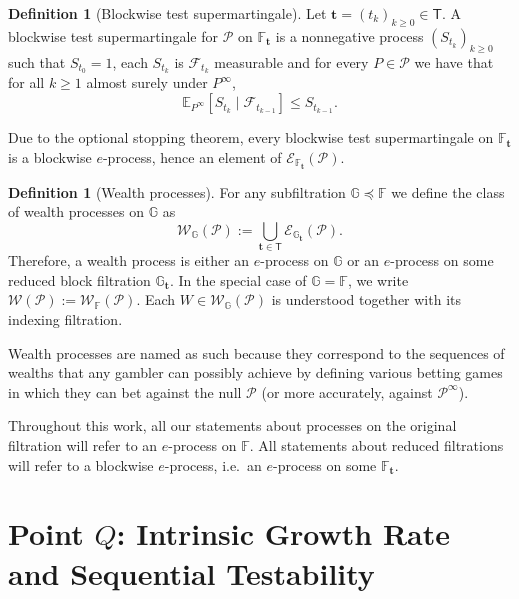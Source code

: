 \documentclass[11pt]{article}
\newcommand{\E}{\mathbb{E}}
\newcommand{\Pcal}{\mathcal{P}}
\newcommand{\bbF}{\mathbb F}
\newcommand{\bbG}{\mathbb G}
\newcommand{\bt}{\mathbf t}
\newcommand{\Tdet}{\mathsf T}
\newcommand{\Wcal}{\mathcal W}
\theoremstyle{definition}
\newtheorem{definition}[theorem]{Definition}
\theoremstyle{definition}
\begin{document}
\begin{definition}[Blockwise test supermartingale]\label{def:test-supermartingale}
Let $\bt=(t_k)_{k\ge 0}\in \Tdet$. A blockwise test supermartingale for $\Pcal$ on $\bbF_{\bt}$ is a nonnegative process $(S_{t_k})_{k\ge 0}$ such that $S_{t_0}=1$, each $S_{t_k}$ is $\mathcal F_{t_k}$ measurable and for every $P\in\Pcal$ we have that for all $k\ge 1$ almost surely under $P^{\infty}$,
\[
\E_{P^{\infty}}[S_{t_k}\mid \mathcal F_{t_{k-1}}]\le S_{t_{k-1}}.
\]
\end{definition}
Due to the optional stopping theorem, every blockwise test supermartingale on $\bbF_{\bt}$ is a blockwise $e$-process, hence an element of $\mathcal E_{\bbF_{\bt}}(\Pcal)$. 

\begin{definition}[Wealth processes]
For any subfiltration $\bbG\preceq\bbF$ we define the class of wealth processes on $\bbG$ as
\[
\Wcal_{\bbG}(\Pcal):=
\bigcup_{\bt\in\Tdet}\mathcal E_{\bbG_{\bt}}(\Pcal).
\]
Therefore, a wealth process is either an $e$-process on $\bbG$ or an $e$-process on some reduced block filtration $\bbG_{\bt}$. In the special case of $\bbG=\bbF$, we write $\Wcal(\Pcal):=\Wcal_{\bbF}(\Pcal)$. Each $W\in\Wcal_{\bbG}(\Pcal)$ is understood together with its indexing filtration.
\end{definition}
Wealth processes are named as such because they correspond to the sequences of wealths that any gambler can possibly achieve by defining various betting games in which they can bet against the null $\Pcal$ (or more accurately, against $\Pcal^\infty$).



Throughout this work, all our statements about processes on the original filtration will refer to an $e$-process on $\bbF$. All statements about reduced filtrations will refer to a blockwise $e$-process, i.e.\ an $e$-process on some $\bbF_{\bt}$.



\section{Point $Q$: Intrinsic Growth Rate and Sequential Testability}\label{sec:point-alternative-infKL}
\end{document}
